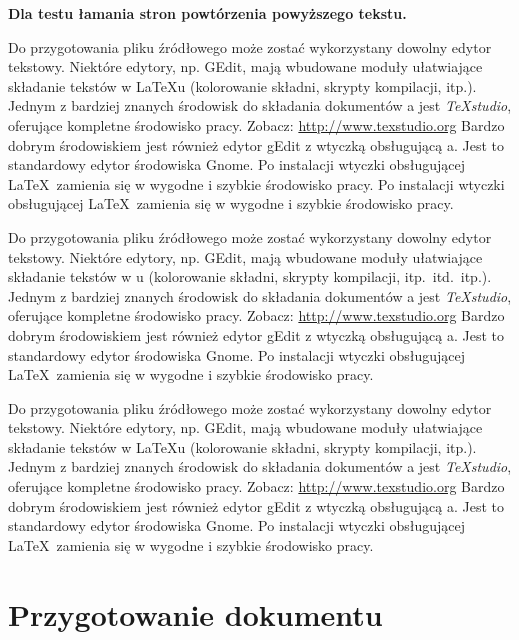 \textbf{Dla testu łamania stron powtórzenia powyższego tekstu.}


Do przygotowania pliku źródłowego może zostać wykorzystany dowolny edytor tekstowy. Niektóre edytory, np. GEdit, mają wbudowane moduły ułatwiające składanie tekstów w LaTeXu (kolorowanie składni, skrypty kompilacji, itp.).
Jednym z bardziej znanych środowisk do składania dokumentów  \LateX a jest {\em TeXstudio}, oferujące kompletne środowisko pracy. Zobacz: \url{http://www.texstudio.org} %
Bardzo dobrym środowiskiem jest również edytor gEdit z wtyczką obsługującą \LateX a. Jest to standardowy edytor środowiska Gnome. Po instalacji wtyczki obsługującej \LaTeX\ zamienia się w wygodne i szybkie środowisko pracy. %
Po instalacji wtyczki obsługującej \LaTeX\ zamienia się w wygodne i szybkie środowisko pracy.

Do przygotowania pliku źródłowego może zostać wykorzystany dowolny edytor tekstowy. Niektóre edytory, np. GEdit, mają wbudowane moduły ułatwiające składanie tekstów w \LateX u (kolorowanie składni, skrypty kompilacji, itp.\ itd.\ itp.). %
Jednym z bardziej znanych środowisk do składania dokumentów  \LateX a jest {\em TeXstudio}, oferujące kompletne środowisko pracy. Zobacz: \url{http://www.texstudio.org} %
Bardzo dobrym środowiskiem jest również edytor gEdit z wtyczką obsługującą \LateX a. Jest to standardowy edytor środowiska Gnome. Po instalacji wtyczki obsługującej \LaTeX\ zamienia się w wygodne i szybkie środowisko pracy. %

Do przygotowania pliku źródłowego może zostać wykorzystany dowolny edytor tekstowy. Niektóre edytory, np. GEdit, mają wbudowane moduły ułatwiające składanie tekstów w LaTeXu (kolorowanie składni, skrypty kompilacji, itp.).
Jednym z bardziej znanych środowisk do składania dokumentów  \LateX a jest {\em TeXstudio}, oferujące kompletne środowisko pracy. Zobacz: \url{http://www.texstudio.org} %
Bardzo dobrym środowiskiem jest również edytor gEdit z wtyczką obsługującą \LateX a. Jest to standardowy edytor środowiska Gnome. Po instalacji wtyczki obsługującej \LaTeX\ zamienia się w wygodne i szybkie środowisko pracy. %


\section{Przygotowanie dokumentu}\label{sec:przygotowanieDokumentu}

